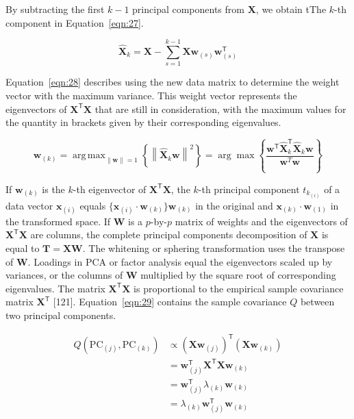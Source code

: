 \documentclass[preprint,12pt]{elsarticle}
\begin{document}
By subtracting the first $k - 1$ principal components from $\mathbf{X}$, we obtain tThe $k$-th component in Equation~\ref{eqn:27}.

\begin{equation}
	\mathbf{\hat{X}}_{k}=\mathbf{X} -\sum_{s=1}^{k-1}\mathbf{X} \mathbf{w}_{\left(s\right)}\mathbf{w}_{\left(s\right)}^{\mathsf{T}}
	\label{eqn:27}
\end{equation}

Equation~\ref{eqn:28} describes using the new data matrix to determine the weight vector with the maximum variance. This weight vector represents the eigenvectors of $\mathbf{X}^{\mathsf{T}}\mathbf{X}$ that are still in consideration, with the maximum values for the quantity in brackets given by their corresponding eigenvalues. 

\begin{equation}
    \mathbf{w}_{\left(k\right)}=\mathop{\operatorname{arg\,max}}_{\left\|\mathbf{w} \right\|=1}\left\{\left\|\mathbf{\hat{X}}_{k}\mathbf{w} \right\|^{2}\right\}=\arg \max \left\{{\frac{\mathbf{w}^{\mathsf{T}}\mathbf{\hat{X}}_{k}^{\mathsf{T}}\mathbf{\hat{X}}_{k}\mathbf{w}}{\mathbf{w}^{T}\mathbf{w}}}\right\}
	\label{eqn:28}
\end{equation}

If $\mathbf{w}_{\left(k\right)}$ is the $k$-th eigenvector of $\mathbf{X}^{\mathsf{T}}\mathbf{X}$, the $k$-th principal component $t_{k_{\left(i\right)}}$ of a data vector $\mathbf{x}_{\left(i\right)}$ equals $\{\mathbf{x}_{\left(i\right)} \cdot \mathbf{w}_{\left(k\right)}\} \mathbf{w}_{\left(k\right)}$ in the original and $\mathbf{x}_{\left(k\right)} \cdot \mathbf{w}_{\left(1\right)}$ in the transformed space. If $\mathbf{W}$ is a $p$-by-$p$ matrix of weights and the eigenvectors of $\mathbf{X}^{\mathsf{T}}\mathbf{X}$ are columns, the complete principal components decomposition of $\mathbf{X}$ is equal to $\mathbf{T} =\mathbf{X} \mathbf{W}$. The whitening or sphering transformation uses the transpose of $\mathbf{W}$. Loadings in PCA or factor analysis equal the eigenvectors scaled up by variances, or the columns of $\mathbf{W}$ multiplied by the square root of corresponding eigenvalues. The matrix $\mathbf{X}^{\mathsf{T}}\mathbf{X}$ is proportional to the empirical sample covariance matrix $\mathbf{X}^{\mathsf{T}}$ [121]. Equation~\ref{eqn:29} contains the sample covariance $Q$ between two principal components.

\begin{equation}
	\begin{aligned}
        Q(\mathrm{PC}_{(j)},\mathrm{PC}_{\left(k\right)})&\propto (\mathbf{X} \mathbf{w}_{(j)})^{\mathsf{T}}(\mathbf{X} \mathbf{w}_{\left(k\right)})\\&=\mathbf{w}_{(j)}^{\mathsf{T}}\mathbf{X}^{\mathsf{T}}\mathbf{X} \mathbf{w}_{\left(k\right)}\\&=\mathbf{w}_{(j)}^{\mathsf{T}}\lambda_{\left(k\right)}\mathbf{w}_{\left(k\right)}\\&=\lambda_{\left(k\right)}\mathbf{w}_{(j)}^{\mathsf{T}}\mathbf{w}_{\left(k\right)}
    \end{aligned}
	\label{eqn:29}
\end{equation}
\end{document}
